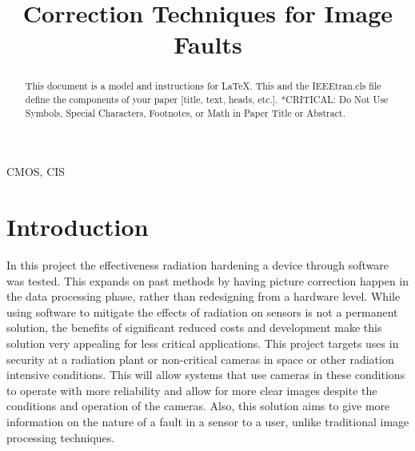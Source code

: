 \documentclass[conference]{IEEEtran}
\begin{document}
\title{Correction Techniques for Image Faults}

\author{
\and
{}
}

\maketitle

\begin{abstract}
This document is a model and instructions for \LaTeX.
This and the IEEEtran.cls file define the components of your paper [title, text, heads, etc.]. *CRITICAL: Do Not Use Symbols, Special Characters, Footnotes, 
or Math in Paper Title or Abstract.
\end{abstract}

\begin{IEEEkeywords}
CMOS, CIS
\end{IEEEkeywords}

\section{Introduction}
In this project the effectiveness radiation hardening a device through software was tested.  This expands on past methods by having picture correction happen in the data processing phase, rather than redesigning from a hardware level. While using software to mitigate the effects of radiation on sensors is not a permanent solution, the benefits of significant reduced costs and development make this solution very appealing for less critical applications. This project targets uses in security at a radiation plant or non-critical cameras in space or other radiation intensive conditions. This will allow systems that use cameras in these conditions to operate with more reliability and allow for more clear images despite the conditions and operation of the cameras.  Also, this solution aims to give more information on the nature of a fault in a sensor to a user, unlike traditional image processing techniques.  
\end{document}
